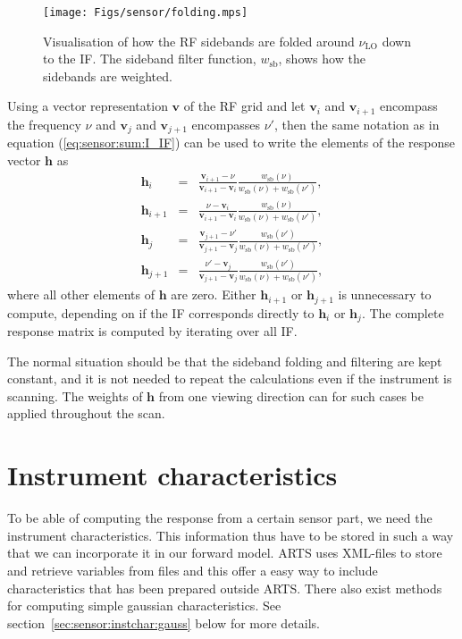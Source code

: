\begin{figure}[!ht]
\begin{center}
  \texttt{[image: Figs/sensor/folding.mps]}
  \caption{Visualisation of how the RF sidebands are folded around $\nu_\mathrm{LO}$ down to the IF. 
           The sideband filter function, $w_\mathrm{sb}$, shows how the sidebands are weighted.}
  \label{fig:sensor:folding}
\end{center}
\end{figure}

 
Using a vector representation $\mathbf{v}$ of the RF grid and let $\mathbf{v}_i$ and $\mathbf{v}_{i+1}$ encompass the frequency $\nu$ and $\mathbf{v}_j$ and $\mathbf{v}_{j+1}$ encompasses $\nu'$, then the same notation as in equation (\ref{eq:sensor:sum:I_IF}) can be used to write the elements of the response vector $\mathbf{h}$ as
\begin{eqnarray}
\mathbf{h}_i & = & \frac{\mathbf{v}_{i+1}-\nu}
     {\mathbf{v}_{i+1}-\mathbf{v}_i} 
     \frac{w_\mathrm{sb}(\nu)}{w_\mathrm{sb}(\nu)+w_\mathrm{sb}(\nu')}, \\
  \mathbf{h}_{i+1} & = & \frac{\nu-\mathbf{v}_i}
     {\mathbf{v}_{i+1}-\mathbf{v}_i} 
     \frac{w_\mathrm{sb}(\nu)}{w_\mathrm{sb}(\nu)+w_\mathrm{sb}(\nu')}, \\
  \mathbf{h}_j & = & \frac{\mathbf{v}_{j+1}-\nu'}
     {\mathbf{v}_{j+1}-\mathbf{v}_j} 
     \frac{w_\mathrm{sb}(\nu')}{w_\mathrm{sb}(\nu)+w_\mathrm{sb}(\nu')}, \\
  \mathbf{h}_{j+1} & = & \frac{\nu'-\mathbf{v}_j}
     {\mathbf{v}_{j+1}-\mathbf{v}_j} 
     \frac{w_\mathrm{sb}(\nu')}{w_\mathrm{sb}(\nu)+w_\mathrm{sb}(\nu')},
\end{eqnarray} 
where all other elements of $\mathbf{h}$ are zero. Either $\mathbf{h}_{i+1}$ or
$\mathbf{h}_{j+1}$ is unnecessary to compute, depending on if the
IF corresponds directly to $\mathbf{h}_{i}$ or $\mathbf{h}_{j}$.
The complete response matrix is computed by iterating over all IF.

The normal situation should be that the sideband folding and
filtering are kept constant, and it is not needed to repeat the
calculations even if the instrument is scanning. The weights of
$\mathbf{h}$ from one viewing direction can for such cases be
applied throughout the scan.

\section{Instrument characteristics}
\label{sec:sensor:instchar}
To be able of computing the response from a certain sensor part, we 
need the instrument characteristics. This information thus have to 
be stored in such a way that we can incorporate it in our forward 
model. ARTS uses XML-files to store and retrieve variables from 
files and this offer a easy way to include characteristics that has been prepared outside ARTS. 
There also exist methods for computing simple gaussian
characteristics. See section~\ref{sec:sensor:instchar:gauss} below for more details.


